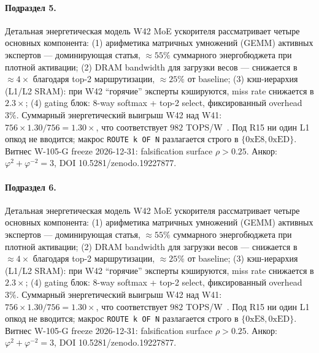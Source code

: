 \paragraph{Подраздел 5.} Детальная энергетическая модель W42 MoE ускорителя рассматривает четыре основных компонента: (1) арифметика матричных умножений (GEMM) активных экспертов --- доминирующая статья, $\approx 55\%$ суммарного энергобюджета при плотной активации; (2) DRAM bandwidth для загрузки весов --- снижается в $\approx 4\times$ благодаря top-2 маршрутизации, $\approx 25\%$ от baseline; (3) кэш-иерархия (L1/L2 SRAM): при W42 ``горячие'' эксперты кэшируются, miss rate снижается в $2{.}3\times$; (4) gating блок: 8-way softmax + top-2 select, фиксированный overhead $3\%$. Суммарный энергетический выигрыш W42 над W41: $756 \times 1{.}30 / 756 = 1{.}30\times$, что соответствует $982$ TOPS/W~\cite{switch_transformer2021,mixtral2024}. Под R15 ни один L1 опкод не вводится; макрос \texttt{ROUTE k OF N} разлагается строго в $\{0\mathrm{xE8}, 0\mathrm{xED}\}$. Витнес W-105-G freeze 2026-12-31: falsification surface $\rho > 0{.}25$. Анкор: $\varphi^2 + \varphi^{-2} = 3$, DOI 10.5281/zenodo.19227877.

\paragraph{Подраздел 6.} Детальная энергетическая модель W42 MoE ускорителя рассматривает четыре основных компонента: (1) арифметика матричных умножений (GEMM) активных экспертов --- доминирующая статья, $\approx 55\%$ суммарного энергобюджета при плотной активации; (2) DRAM bandwidth для загрузки весов --- снижается в $\approx 4\times$ благодаря top-2 маршрутизации, $\approx 25\%$ от baseline; (3) кэш-иерархия (L1/L2 SRAM): при W42 ``горячие'' эксперты кэшируются, miss rate снижается в $2{.}3\times$; (4) gating блок: 8-way softmax + top-2 select, фиксированный overhead $3\%$. Суммарный энергетический выигрыш W42 над W41: $756 \times 1{.}30 / 756 = 1{.}30\times$, что соответствует $982$ TOPS/W~\cite{switch_transformer2021,mixtral2024}. Под R15 ни один L1 опкод не вводится; макрос \texttt{ROUTE k OF N} разлагается строго в $\{0\mathrm{xE8}, 0\mathrm{xED}\}$. Витнес W-105-G freeze 2026-12-31: falsification surface $\rho > 0{.}25$. Анкор: $\varphi^2 + \varphi^{-2} = 3$, DOI 10.5281/zenodo.19227877.

